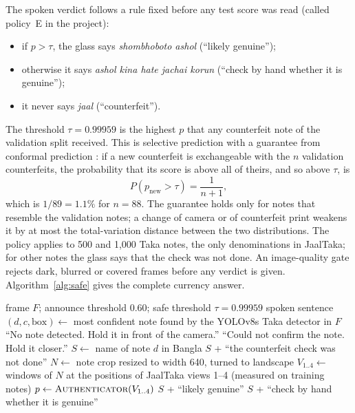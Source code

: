 The spoken verdict follows a rule fixed before any test score was read (called policy~E in the project):
\begin{itemize}[noitemsep]
    \item if $p > \tau$, the glass says \textit{shombhoboto ashol} (``likely genuine'');
    \item otherwise it says \textit{ashol kina hate jachai korun} (``check by hand whether it is genuine'');
    \item it never says \textit{jaal} (``counterfeit'').
\end{itemize}
The threshold $\tau = 0.99959$ is the highest $p$ that any counterfeit note of the validation split received. This is selective prediction \cite{chow1970, selective2017} with a guarantee from conformal prediction \cite{vovk2005}: if a new counterfeit is exchangeable with the $n$ validation counterfeits, the probability that its score is above all of theirs, and so above $\tau$, is
\begin{equation}
P(p_{\text{new}} > \tau) = \frac{1}{n+1},
\end{equation}
which is $1/89 = 1.1\%$ for $n = 88$. The guarantee holds only for notes that resemble the validation notes; a change of camera or of counterfeit print weakens it by at most the total-variation distance between the two distributions. The policy applies to 500 and 1,000 Taka notes, the only denominations in JaalTaka; for other notes the glass says that the check was not done. An image-quality gate rejects dark, blurred or covered frames before any verdict is given. Algorithm~\ref{alg:safe} gives the complete currency answer.

\begin{algorithm}[!htbp]
\caption{Currency answer with the safe verdict policy}
\label{alg:safe}
\begin{algorithmic}[1]
\Require frame $F$; announce threshold $0.60$; safe threshold $\tau = 0.99959$
\Ensure spoken sentence
\State $(d, c, \text{box}) \gets$ most confident note found by the YOLOv8s Taka detector in $F$
 \State \Return ``No note detected. Hold it in front of the camera.'' \EndIf
{} \State \Return ``Could not confirm the note. Hold it closer.'' \EndIf
\State $S \gets$ name of note $d$ in Bangla
 \State \Return $S$ + ``the counterfeit check was not done'' \EndIf
\State $N \gets$ note crop resized to width 640, turned to landscape
\State $V_{1..4} \gets$ windows of $N$ at the positions of JaalTaka views 1--4 (measured on training notes)
\State $p \gets \textsc{Authenticator}(V_{1..4})$ 
 \State \Return $S$ + ``likely genuine''
\Else \State \Return $S$ + ``check by hand whether it is genuine'' 
\EndIf
\end{algorithmic}
\end{algorithm}


